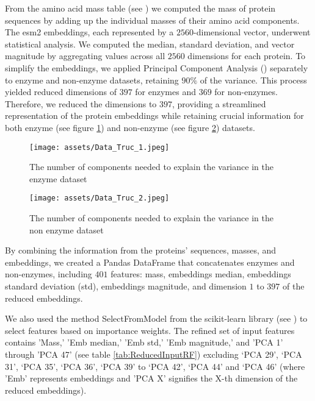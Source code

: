 \documentclass{bioinfo}
\begin{document}
\begin{methods}
From the amino acid mass table (see \cite{BioinformaticsSolutionsInc}) we computed the mass of protein sequences by adding up the individual masses of their amino acid components.
The esm2 embeddings, each represented by a $2560$-dimensional vector, underwent statistical analysis.
We computed the median, standard deviation, and vector magnitude by aggregating values across all $2560$ dimensions for each protein.
To simplify the embeddings, we applied Principal Component Analysis (\cite{scikit-learn})
separately to enzyme and non-enzyme datasets,
retaining $90\%$ of the variance. This process yielded reduced dimensions of $397$ for enzymes and $369$ for non-enzymes. 
Therefore, we reduced the dimensions to $397$, providing a streamlined representation of the protein embeddings while retaining crucial information for both 
enzyme (see figure \ref{fig:PCA_enzymes}) and non-enzyme (see figure \ref{fig:PCA_nonEnzymes}) datasets.

\begin{figure}[!bp]
\texttt{[image: assets/Data\_Truc\_1.jpeg]}
\caption{The number of components needed to explain the variance in the enzyme dataset}\label{fig:PCA_enzymes}
\end{figure}

\begin{figure}[!tbp]
\texttt{[image: assets/Data\_Truc\_2.jpeg]}
\caption{The number of components needed to explain the variance in the non enzyme dataset}\label{fig:PCA_nonEnzymes}
\end{figure}


By combining the information from the proteins’ sequences, masses, and embeddings, we created a Pandas DataFrame that concatenates enzymes and non-enzymes,
including $401$ features: mass, embeddings median, embeddings standard deviation (std), embeddings magnitude, and dimension $1$ to $397$ of the reduced 
embeddings. 

We also used the method SelectFromModel from the scikit-learn library (see \cite{scikit-learn})
to select features based on importance weights. 
The refined set of input features contains 
'Mass,' 'Emb median,' 'Emb std,' 'Emb magnitude,' and 'PCA 1' through 'PCA 47' (see table \ref{tab:ReducedInputRF}) excluding ‘PCA 29’, ‘PCA 31’, ‘PCA 35’, 
‘PCA 36’, ‘PCA 39’ to ‘PCA 42’, ‘PCA 44’ and ‘PCA 46’ (where 'Emb' represents embeddings and 'PCA X' signifies the X-th dimension of the reduced embeddings).


\end{methods}
\end{document}
